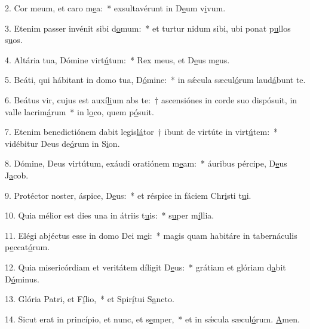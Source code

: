 2. Cor meum, et caro m\uline{e}a:~* exsultavérunt in D\uline{e}um v\uline{i}vum.\par 
3. Etenim passer invénit sibi d\uline{o}mum:~* et turtur nidum sibi, ubi ponat p\uline{u}llos s\uline{u}os.\par 
4. Altária tua, Dómine virt\uline{ú}tum:~* Rex meus, et D\uline{e}us m\uline{e}us.\par 
5. Beáti, qui hábitant in domo tua, D\uline{ó}mine:~* in sǽcula sæcul\uline{ó}rum laud\uline{á}bunt te.\par 
6. Beátus vir, cujus est auxí\uline{li}um abs te:~† ascensiónes in corde suo dispósuit, in valle lacrim\uline{á}rum~* in l\uline{o}co, quem p\uline{ó}suit.\par 
7. Etenim benedictiónem dabit legis\uline{lá}tor~† ibunt de virtúte in virt\uline{ú}tem:~* vidébitur Deus de\uline{ó}rum in S\uline{i}on.\par 
8. Dómine, Deus virtútum, exáudi oratiónem m\uline{e}am:~* áuribus pércipe, D\uline{e}us J\uline{a}cob.\par 
9. Protéctor noster, áspice, D\uline{e}us:~* et réspice in fáciem Chr\uline{i}sti t\uline{u}i.\par 
10. Quia mélior est dies una in átriis t\uline{u}is:~* s\uline{u}per m\uline{í}llia.\par 
11. Elégi abjéctus esse in domo Dei m\uline{e}i:~* magis quam habitáre in tabernáculis p\uline{e}ccat\uline{ó}rum.\par 
12. Quia misericórdiam et veritátem díligit D\uline{e}us:~* grátiam et glóriam d\uline{a}bit D\uline{ó}minus.\par 
13. Glória Patri, et F\uline{í}lio,~* et Spir\uline{í}tui S\uline{a}ncto.\par 
14. Sicut erat in princípio, et nunc, et s\uline{e}mper,~* et in sǽcula sæcul\uline{ó}rum. \uline{A}men.\par 
